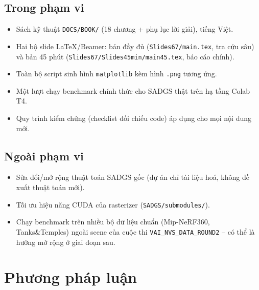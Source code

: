 \documentclass[a4paper,11pt]{article}
\begin{document}
\subsection{Trong phạm vi}
\begin{itemize}[leftmargin=1.2em]
    \item Sách kỹ thuật \texttt{DOCS/BOOK/} (18 chương + phụ lục lời giải), tiếng Việt.
    \item Hai bộ slide LaTeX/Beamer: bản đầy đủ (\texttt{Slides67/main.tex}, tra cứu sâu) và
    bản 45 phút (\texttt{Slides67/Slides45min/main45.tex}, báo cáo chính).
    \item Toàn bộ script sinh hình \texttt{matplotlib} kèm hình \texttt{.png} tương ứng.
    \item Một lượt chạy benchmark chính thức cho SADGS thật trên hạ tầng Colab T4.
    \item Quy trình kiểm chứng (checklist đối chiếu code) áp dụng cho mọi nội dung mới.
\end{itemize}

\subsection{Ngoài phạm vi}
\begin{itemize}[leftmargin=1.2em]
    \item Sửa đổi/mở rộng thuật toán SADGS gốc (dự án chỉ tài liệu hoá, không đề xuất thuật
    toán mới).
    \item Tối ưu hiệu năng CUDA của rasterizer (\texttt{SADGS/submodules/}).
    \item Chạy benchmark trên nhiều bộ dữ liệu chuẩn (Mip-NeRF360, Tanks\&Temples) ngoài scene
    của cuộc thi \texttt{VAI\_NVS\_DATA\_ROUND2} -- có thể là hướng mở rộng ở giai đoạn sau.
\end{itemize}

\section{Phương pháp luận}
\end{document}
